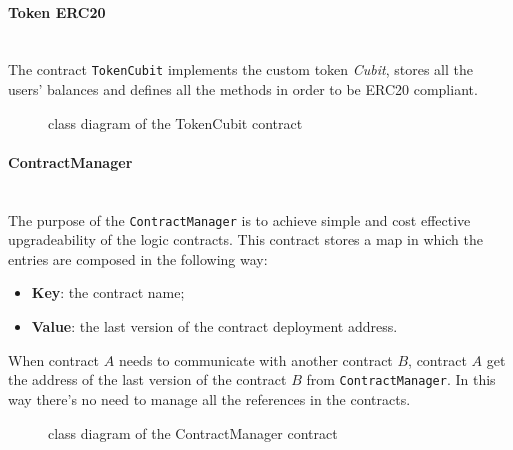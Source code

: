 \paragraph{Token ERC20}\mbox{}\\

\noindent The contract \texttt{TokenCubit} implements the custom token \textit{Cubit}, stores all the users' balances and defines all the methods in order to be ERC20 compliant.
\begin{figure}[H]
	\centering
	\caption{class diagram of the TokenCubit contract}
\end{figure}

\paragraph{ContractManager}\mbox{}\\ 

\noindent The purpose of the \texttt{ContractManager} is to achieve simple and cost effective upgradeability of the logic contracts. This contract stores a map in which the entries are composed in the following way:
\begin{itemize}
	\item\textbf{Key}: the contract name;
	\item\textbf{Value}: the last version of the contract deployment address.
\end{itemize}
When contract $A$ needs to communicate with another contract $B$, contract $A$ get the address of the last version of the contract $B$ from \texttt{ContractManager}. In this way there's no need to manage all the references in the contracts. 
\begin{figure}[H]
	\centering
	\caption{class diagram of the ContractManager contract}
\end{figure}
\pagebreak
